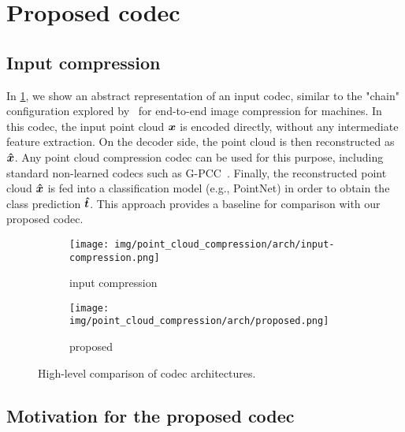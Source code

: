 \section{Proposed codec}
\label{sec:proposed-codec}

\subsection{Input compression}

In \cref{fig:arch-comparison/input-compression}, we show an abstract representation of an input codec, similar to the "chain" configuration explored by~\cite{chamain2020endtoend} for end-to-end image compression for machines.
In this codec, the input point cloud ${\boldsymbol{x}}$ is encoded directly, without any intermediate feature extraction.
On the decoder side, the point cloud is then reconstructed as ${\boldsymbol{\hat{x}}}$.
Any point cloud compression codec can be used for this purpose, including standard non-learned codecs such as G-PCC~\cite{mpeg2019gpccv2}.
Finally, the reconstructed point cloud ${\boldsymbol{\hat{x}}}$ is fed into a classification model (e.g., PointNet) in order to obtain the class prediction ${\boldsymbol{\hat{t}}}$.
This approach provides a baseline for comparison with our proposed codec.

\begin{figure}[tbp]
  \centering
  \begin{subfigure}[b]{0.53\linewidth}
    \centering
    \texttt{[image: img/point\_cloud\_compression/arch/input-compression.png]}
    \caption{input compression}
    \label{fig:arch-comparison/input-compression}
  \end{subfigure}%
  \vspace{1.5\baselineskip}
  \begin{subfigure}[b]{0.62\linewidth}
    \centering
    \texttt{[image: img/point\_cloud\_compression/arch/proposed.png]}
    \caption{proposed}
    \label{fig:arch-comparison/proposed}
  \end{subfigure}%
  \caption[High-level comparison of codec architectures]{%
    High-level comparison of codec architectures.%
  }
  \label{fig:arch-comparison}
\end{figure}



\subsection{Motivation for the proposed codec}

